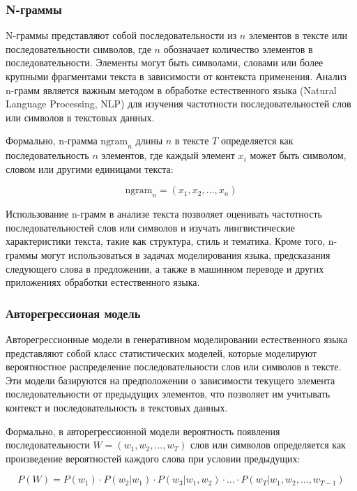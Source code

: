 \subsubsection{N-граммы}

N-граммы представляют собой последовательности из \( n \) элементов в тексте или последовательности символов, где \( n \) обозначает количество элементов в последовательности. Элементы могут быть символами, словами или более крупными фрагментами текста в зависимости от контекста применения. Анализ n-грамм является важным методом в обработке естественного языка (Natural Language Processing, NLP) для изучения частотности последовательностей слов или символов в текстовых данных.

Формально, n-грамма \( \text{ngram}_n \) длины \( n \) в тексте \( T \) определяется как последовательность \( n \) элементов, где каждый элемент \( x_i \) может быть символом, словом или другими единицами текста:

\[ \text{ngram}_n = (x_1, x_2, ..., x_n) \]

Использование n-грамм в анализе текста позволяет оценивать частотность последовательностей слов или символов и изучать лингвистические характеристики текста, такие как структура, стиль и тематика. Кроме того, n-граммы могут использоваться в задачах моделирования языка, предсказания следующего слова в предложении, а также в машинном переводе и других приложениях обработки естественного языка.

\subsubsection{Авторегрессионая модель}


Авторегрессионные модели в генеративном моделировании естественного языка представляют собой класс статистических моделей, которые моделируют вероятностное распределение последовательности слов или символов в тексте. Эти модели базируются на предположении о зависимости текущего элемента последовательности от предыдущих элементов, что позволяет им учитывать контекст и последовательность в текстовых данных.

Формально, в авторегрессионной модели вероятность появления последовательности \( W = (w_1, w_2, ..., w_T) \) слов или символов определяется как произведение вероятностей каждого слова при условии предыдущих:

\[ P(W) = P(w_1) \cdot P(w_2|w_1) \cdot P(w_3|w_1, w_2) \cdot \ldots \cdot P(w_T|w_1, w_2, ..., w_{T-1}) \]

